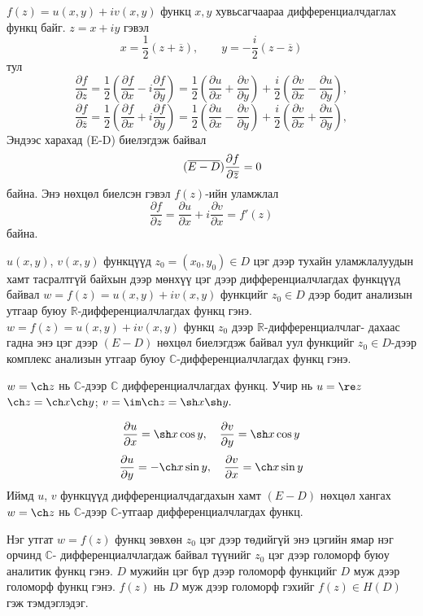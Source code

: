 $f(z)=u(x,y)+iv(x,y)$ функц $x,y$ хувьсагчаараа дифференциалчдаглах функц байг. $z=x+iy$ гэвэл
$$x=\frac{1}{2}(z+\overline{z}), \qquad y=-\frac{i}{2}(z-\overline{z})$$ тул 
$$\frac{\partial f}{\partial z}=\frac{1}{2}\left(\frac{\partial f}{\partial x}-i\frac{\partial f}{\partial y}\right)=\dfrac{1}{2} \left(\frac{\partial u}{\partial x}+\frac{\partial v}{\partial y}\right) +\frac{i}{2} \left(\frac{\partial v}{\partial x}-\frac{\partial u}{\partial y}\right),$$
$$\frac{\partial f}{\partial \overline{z}}=\frac{1}{2}\left(\frac{\partial f}{\partial x}+i\frac{\partial f}{\partial y}\right)=\dfrac{1}{2} \left(\frac{\partial u}{\partial x}-\frac{\partial v}{\partial y}\right) +\frac{i}{2} \left(\frac{\partial v}{\partial x}+\frac{\partial u}{\partial y}\right),$$
Эндээс харахад (E-D) биелэгдэж байвал
\begin{equation}
 \tag{$\overline{E-D}$}
 \dfrac{\partial f}{\partial \overline{z}}=0
\end{equation}
байна. Энэ нөхцөл биелсэн гэвэл $f(z)$-ийн уламжлал
$$\frac{\partial f}{\partial z}=\frac{\partial u}{\partial x}+i\frac{\partial v}{\partial x}=f'(z)$$
байна.
\begin{dfn}
$u(x,y)$, $v(x,y)$ функцүүд $z_0=(x_0, y_0)\in D$ цэг дээр тухайн уламжлалуудын хамт тасралтгүй байхын дээр мөнхүү цэг дээр дифференциалчлагдах функцүүд байвал $w=f(z)=u(x,y)+iv(x,y)$ функцийг $z_0\in D$ дээр бодит анализын утгаар буюу $\mathbb{R}$-дифференциалчлагдах функц гэнэ. \\ $w=f(z)=u(x,y)+iv(x,y)$ функц $z_0$ дээр $\mathbb{R}$-дифференциалчлаг-
дахаас гадна энэ цэг дээр $(E-D)$ нөхцөл биелэгдэж байвал уул функцийг $z_0\in D$-дээр комплекс анализын утгаар буюу $\mathbb{C}$-дифференциалчлагдах функц гэнэ.
\end{dfn}
\begin{exm}
 $w= \ch z$ нь $\mathbb{C}$-дээр $\mathbb{C}$ дифференциалчлагдах функц. Учир нь $u= \re z$ $\ch z=\ch x \ch y$; $v= \im \ch z= \sh x \sh y.$
\end{exm}
\begin{sol}
$$\frac{\partial u}{\partial x}=\sh x \cos y, \quad \frac{\partial v}{\partial y}=\sh x\cos y$$
$$\frac{\partial u}{\partial y}=-\ch x \sin  y, \quad \frac{\partial v}{\partial x}=\ch  x\sin y$$
Иймд $u$, $v$ функцүүд дифференциалчдагдахын хамт $(E-D)$ нөхцөл хангах $w=\ch z$ нь $\mathbb{C}$-дээр $\mathbb{C}$-утгаар дифференциалчлагдах функц. 
\end{sol}
\begin{dfn}
Нэг утгат $w=f(z)$ функц зөвхөн $z_0$ цэг дээр төдийгүй энэ цэгийн ямар нэг орчинд  $\mathbb{C}$- дифференциалчлагдаж байвал түүнийг $z_0$ цэг дээр голоморф буюу аналитик функц гэнэ. $D$ мужийн цэг бүр дээр голоморф функцийг $D$ муж дээр голоморф функц  гэнэ. $f(z)$ нь $D$ муж дээр голоморф гэхийг $f(z)\in H(D)$ гэж тэмдэглэдэг.
\end{dfn}
